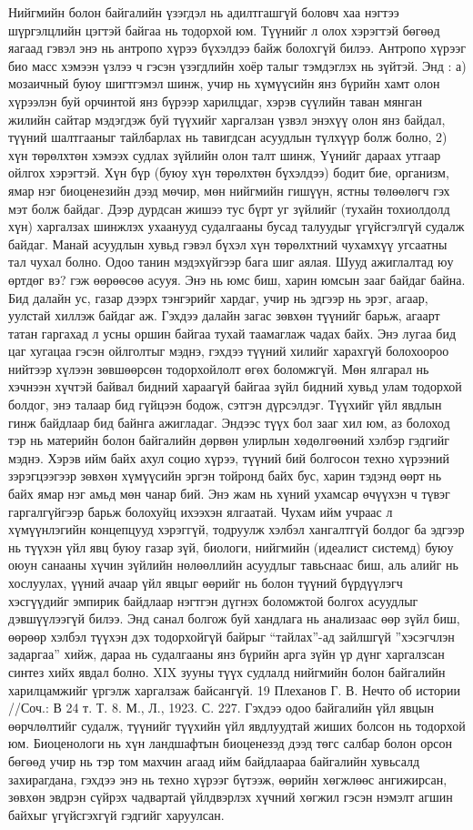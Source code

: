 Нийгмийн болон байгалийн үзэгдэл нь адилтгашгүй боловч хаа нэгтээ шүргэлцлийн цэгтэй байгаа нь тодорхой юм. Түүнийг л олох хэрэгтэй бөгөөд яагаад гэвэл энэ нь антропо хүрээ бүхэлдээ байж болохгүй билээ. Антропо хүрээг био масс хэмээн үзлээ ч гэсэн үзэгдлийн хоёр талыг тэмдэглэх нь зүйтэй. Энд : а) мозаичный буюу шигтгэмэл шинж, учир нь хүмүүсийн янз бүрийн хамт олон хүрээлэн буй орчинтой янз бүрээр харилцдаг, хэрэв сүүлийн таван мянган жилийн сайтар мэдэгдэж буй түүхийг харгалзан үзвэл энэхүү олон янз байдал, түүний шалтгааныг тайлбарлах нь тавигдсан асуудлын түлхүүр болж болно, 2) хүн төрөлхтөн хэмээх судлах зүйлийн олон талт шинж, Үүнийг дараах утгаар ойлгох хэрэгтэй. Хүн бүр (буюу хүн төрөлхтөн бүхэлдээ) бодит бие, организм, ямар нэг биоценезийн дээд мөчир, мөн нийгмийн гишүүн, ястны төлөөлөгч гэх мэт болж байдаг. Дээр дурдсан жишээ тус бүрт уг зүйлийг (тухайн тохиолдолд хүн) харгалзах шинжлэх ухаанууд судалгааны бусад талуудыг үгүйсгэлгүй судалж байдаг. Манай асуудлын хувьд гэвэл бүхэл хүн төрөлхтний чухамхүү угсаатны тал чухал болно.
Одоо танин мэдэхүйгээр бага шиг аялая. Шууд ажиглалтад юу өртдөг вэ? гэж өөрөөсөө асууя. Энэ нь юмс биш, харин юмсын зааг байдаг байна. Бид далайн ус, газар дээрх тэнгэрийг хардаг, учир нь эдгээр нь эрэг, агаар, уулстай хиллэж байдаг аж.
Гэхдээ далайн загас зөвхөн түүнийг барьж, агаарт татан гаргахад л усны оршин байгаа тухай таамаглаж чадах байх. Энэ лугаа бид цаг хугацаа гэсэн ойлголтыг мэднэ, гэхдээ түүний хилийг харахгүй болохоороо нийтээр хүлээн зөвшөөрсөн тодорхойлолт өгөх боломжгүй. Мөн ялгарал нь хэчнээн хүчтэй байвал бидний хараагүй байгаа зүйл бидний хувьд улам тодорхой болдог, энэ талаар бид гүйцээн бодож, сэтгэн дүрсэлдэг.
Түүхийг үйл явдлын гинж байдлаар бид байнга ажигладаг. Эндээс түүх бол зааг хил юм, аз болоход тэр нь материйн болон байгалийн дөрвөн улирлын хөдөлгөөний хэлбэр гэдгийг мэднэ. Хэрэв ийм байх ахул социо хүрээ, түүний бий болгосон техно хүрээний зэрэгцээгээр зөвхөн хүмүүсийн эргэн тойронд байх бус, харин тэдэнд өөрт нь байх ямар нэг амьд мөн чанар бий. Энэ жам нь хүний ухамсар өчүүхэн ч түвэг гаргалгүйгээр барьж болохуйц ихээхэн ялгаатай. Чухам ийм учраас л хүмүүнлэгийн концепцууд хэрэггүй, тодруулж хэлбэл хангалтгүй болдог ба эдгээр нь түүхэн үйл явц буюу газар зүй, биологи, нийгмийн (идеалист системд) буюу оюун санааны хүчин зүйлийн нөлөөллийн асуудлыг тавьснаас биш, аль алийг нь хослуулах, үүний ачаар үйл явцыг өөрийг нь болон түүний бүрдүүлэгч хэсгүүдийг эмпирик байдлаар нэгтгэн дүгнэх боломжтой болгох асуудлыг дэвшүүлээгүй билээ.
Энд санал болгож буй хандлага нь анализаас өөр зүйл биш, өөрөөр хэлбэл түүхэн дэх тодорхойгүй байрыг “тайлах”-ад зайлшгүй ”хэсэгчлэн задаргаа” хийж, дараа нь судалгааны янз бүрийн арга зүйн үр дүнг харгалзсан синтез хийх явдал болно.
XIX зууны түүх судлалд нийгмийн болон байгалийн харилцамжийг үргэлж харгалзаж байсангүй.
19 Плеханов Г. В. Нечто об истории //Соч.: В 24 т. Т. 8. М., Л., 1923. С. 227.
Гэхдээ одоо байгалийн үйл явцын өөрчлөлтийг судалж, түүнийг түүхийн үйл явдлуудтай жиших болсон нь тодорхой юм. Биоценологи нь хүн ландшафтын биоценезэд дээд төгс салбар болон орсон бөгөөд учир нь тэр том махчин агаад ийм байдлаараа байгалийн хувьсалд захирагдана, гэхдээ энэ нь техно хүрээг бүтээж, өөрийн хөгжлөөс ангижирсан, зөвхөн эвдрэн сүйрэх чадвартай үйлдвэрлэх хүчний хөгжил гэсэн нэмэлт агшин байхыг үгүйсгэхгүй гэдгийг харуулсан.
